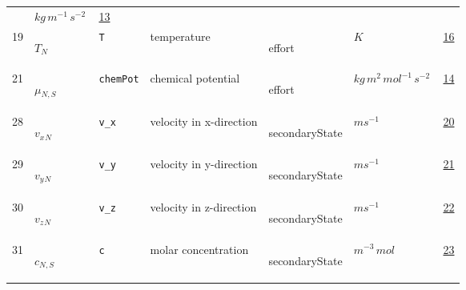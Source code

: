 \begin{longtable}{|p{1cm}|p{2.5cm}|p{4.5cm}|p{8cm}|p{3.0cm}|p{3cm}|p{1cm}|}
             & $ kg \,m^{-1} \,s^{-2} \, $
             &                 \hyperlink{"e:13"}{ 13 }
                 \\
            19
             & \hypertarget{"v:19"}{ $ {T}{_{N}} $}
             & \verb|T|
             & temperature
             & \begin{lay}effort \end{lay}
             & $ K \, $
             &                 \hyperlink{"e:16"}{ 16 }
                 \\
            21
             & \hypertarget{"v:21"}{ $ {{\mu}}{_{N, S}} $}
             & \verb|chemPot|
             & chemical potential
             & \begin{lay}effort \end{lay}
             & $ kg \,m^{2} \,mol^{-1} \,s^{-2} \, $
             &                 \hyperlink{"e:14"}{ 14 }
                 \\
            28
             & \hypertarget{"v:28"}{ $ {{v_x}}{_{N}} $}
             & \verb|v_x|
             & velocity in x-direction
             & \begin{lay}secondaryState \end{lay}
             & $ m s^{-1} \, $
             &                 \hyperlink{"e:20"}{ 20 }
                 \\
            29
             & \hypertarget{"v:29"}{ $ {{v_y}}{_{N}} $}
             & \verb|v_y|
             & velocity in y-direction
             & \begin{lay}secondaryState \end{lay}
             & $ m s^{-1} \, $
             &                 \hyperlink{"e:21"}{ 21 }
                 \\
            30
             & \hypertarget{"v:30"}{ $ {{v_z}}{_{N}} $}
             & \verb|v_z|
             & velocity in z-direction
             & \begin{lay}secondaryState \end{lay}
             & $ m s^{-1} \, $
             &                 \hyperlink{"e:22"}{ 22 }
                 \\
            31
             & \hypertarget{"v:31"}{ $ {c}{_{N, S}} $}
             & \verb|c|
             & molar concentration
             & \begin{lay}secondaryState \end{lay}
             & $ m^{-3} \,mol \, $
             &                 \hyperlink{"e:23"}{ 23 }
                 \\
    \end{longtable}